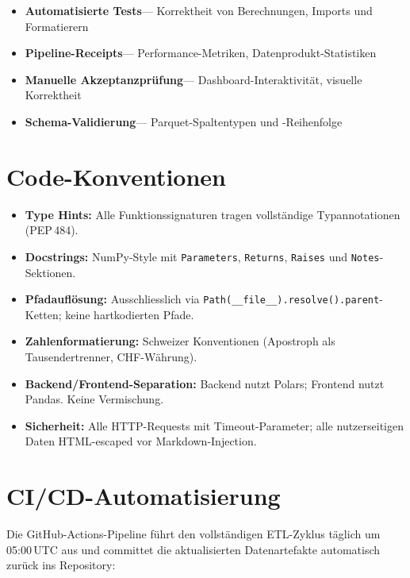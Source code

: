 \documentclass[12pt, a4paper, oneside]{report}
\newcommand{\code}[1]{\texttt{\small\textcolor{darknavy}{#1}}}
\begin{document}
\begin{itemize}
  \item \textbf{Automatisierte Tests}\;--- Korrektheit von Berechnungen, Imports und Formatierern
  \item \textbf{Pipeline-Receipts}\;--- Performance-Metriken, Datenprodukt-Statistiken
  \item \textbf{Manuelle Akzeptanzpr\"ufung}\;--- Dashboard-Interaktivit\"at, visuelle Korrektheit
  \item \textbf{Schema-Validierung}\;--- Parquet-Spaltentypen und -Reihenfolge
\end{itemize}

\section{Code-Konventionen}

\begin{itemize}
  \item \textbf{Type Hints:} Alle Funktionssignaturen tragen vollst\"andige Typannotationen (PEP\,484).
  \item \textbf{Docstrings:} NumPy-Style mit \code{Parameters}, \code{Returns}, \code{Raises} und \code{Notes}-Sektionen.
  \item \textbf{Pfadaufl\"osung:} Ausschliesslich via \code{Path(\_\_file\_\_).resolve().parent}-Ketten; keine hartkodierten Pfade.
  \item \textbf{Zahlenformatierung:} Schweizer Konventionen (Apostroph als Tausendertrenner, CHF-W\"ahrung).
  \item \textbf{Backend/Frontend-Separation:} Backend nutzt Polars; Frontend nutzt Pandas. Keine Vermischung.
  \item \textbf{Sicherheit:} Alle HTTP-Requests mit Timeout-Parameter; alle nutzerseitigen Daten HTML-escaped vor Markdown-Injection.
\end{itemize}

\section{CI/CD-Automatisierung}

Die GitHub-Actions-Pipeline f\"uhrt den vollst\"andigen ETL-Zyklus t\"aglich um 05:00\,UTC aus und committet die aktualisierten Datenartefakte automatisch zur\"uck ins Repository:
\end{document}
